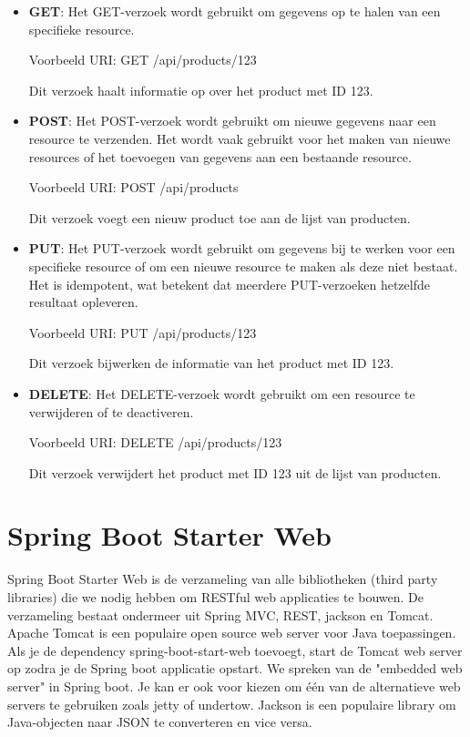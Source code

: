 \begin{itemize}
\item \textbf{GET}: Het GET-verzoek wordt gebruikt om gegevens op te halen van een specifieke resource. 

Voorbeeld URI: GET /api/products/123

Dit verzoek haalt informatie op over het product met ID 123.

\item \textbf{POST}: Het POST-verzoek wordt gebruikt om nieuwe gegevens naar een resource te verzenden. Het wordt vaak gebruikt voor het maken van nieuwe resources of het toevoegen van gegevens aan een bestaande resource.

Voorbeeld URI: POST /api/products

Dit verzoek voegt een nieuw product toe aan de lijst van producten.

\item \textbf{PUT}: Het PUT-verzoek wordt gebruikt om gegevens bij te werken voor een specifieke resource of om een nieuwe resource te maken als deze niet bestaat. Het is idempotent, wat betekent dat meerdere PUT-verzoeken hetzelfde resultaat opleveren.

Voorbeeld URI: PUT /api/products/123

Dit verzoek bijwerken de informatie van het product met ID 123.

\item \textbf{DELETE}: Het DELETE-verzoek wordt gebruikt om een resource te verwijderen of te deactiveren.

Voorbeeld URI: DELETE /api/products/123

Dit verzoek verwijdert het product met ID 123 uit de lijst van producten.
\end{itemize}

\section{Spring Boot Starter Web}

Spring Boot Starter Web is de verzameling van alle bibliotheken (third party libraries) die we nodig hebben om RESTful web applicaties te bouwen.  De verzameling bestaat ondermeer uit Spring MVC,  REST,  jackson en Tomcat. 
Apache Tomcat is een populaire open source web server voor Java toepassingen.  Als je de dependency spring-boot-start-web toevoegt, start de Tomcat web server op zodra je de Spring boot applicatie opstart.  We spreken van de "embedded web server" in Spring boot.  Je kan er ook voor kiezen om  \'e\'en van de alternatieve web servers te gebruiken zoals jetty of undertow. 
Jackson is een populaire library om Java-objecten naar JSON te converteren en vice versa.

